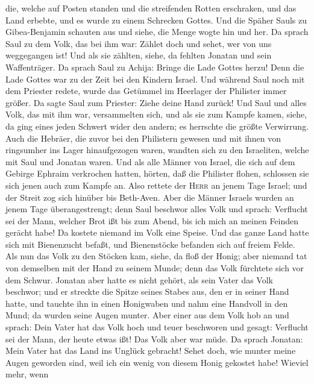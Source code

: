 die, welche auf Posten standen und die streifenden Rotten erschraken,
und das Land erbebte, und es wurde zu einem Schrecken Gottes.
 Und die Späher Sauls zu Gibea-Benjamin schauten aus und
siehe, die Menge wogte hin und her.  Da sprach Saul zu
dem Volk, das bei ihm war: Zählet doch und sehet, wer von uns
weggegangen ist! Und als sie zählten, siehe, da fehlten Jonatan und sein
Waffenträger.  Da sprach Saul zu Achija: Bringe die Lade
Gottes herzu! Denn die Lade Gottes war zu der Zeit bei den Kindern
Israel.  Und während Saul noch mit dem Priester redete,
wurde das Getümmel im Heerlager der Philister immer größer. Da sagte
Saul zum Priester: Ziehe deine Hand zurück!  Und Saul und
alles Volk, das mit ihm war, versammelten sich, und als sie zum Kampfe
kamen, siehe, da ging eines jeden Schwert wider den andern; es herrschte
die größte Verwirrung.  Auch die Hebräer, die zuvor bei
den Philistern gewesen und mit ihnen von ringsumher ins Lager
hinaufgezogen waren, wandten sich zu den Israeliten, welche mit Saul und
Jonatan waren.  Und als alle Männer von Israel, die sich
auf dem Gebirge Ephraim verkrochen hatten, hörten, daß die Philister
flohen, schlossen sie sich jenen auch zum Kampfe an. 
Also rettete der \textsc{Herr} an jenem Tage Israel; und der Streit zog
sich hinüber bis Beth-Aven.  Aber die Männer Israels
wurden an jenem Tage überangestrengt; denn Saul beschwor alles Volk und
sprach: Verflucht sei der Mann, welcher Brot ißt bis zum Abend, bis ich
mich an meinen Feinden gerächt habe! Da kostete niemand im Volk eine
Speise.  Und das ganze Land hatte sich mit Bienenzucht
befaßt, und Bienenstöcke befanden sich auf freiem Felde. 
Als nun das Volk zu den Stöcken kam, siehe, da floß der Honig; aber
niemand tat von demselben mit der Hand zu seinem Munde; denn das Volk
fürchtete sich vor dem Schwur.  Jonatan aber hatte es
nicht gehört, als sein Vater das Volk beschwor; und er streckte die
Spitze seines Stabes aus, den er in seiner Hand hatte, und tauchte ihn
in einen Honigwaben und nahm eine Handvoll in den Mund; da wurden seine
Augen munter.  Aber einer aus dem Volk hob an und sprach:
Dein Vater hat das Volk hoch und teuer beschworen und gesagt: Verflucht
sei der Mann, der heute etwas ißt! Das Volk aber war müde.
 Da sprach Jonatan: Mein Vater hat das Land ins Unglück
gebracht! Sehet doch, wie munter meine Augen geworden sind, weil ich ein
wenig von diesem Honig gekostet habe!  Wieviel mehr, wenn
